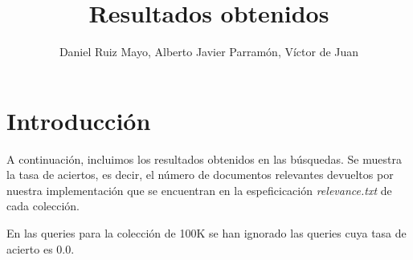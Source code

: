 \documentclass[palatino]{apuntes}
\title{Resultados obtenidos}
\author{Daniel Ruiz Mayo, Alberto Javier Parramón, Víctor de Juan}
\date{}
\begin{document}
\pagestyle{plain}
\maketitle
\section{Introducción}
A continuación, incluimos los resultados obtenidos en las búsquedas. Se muestra la tasa de aciertos, es decir, el número de documentos relevantes devueltos por nuestra implementación que se encuentran en la espeficicación \textit{relevance.txt} de cada colección.

En las queries para la colección de 100K se han ignorado las queries cuya tasa de acierto es 0.0.




\appendix
\end{document}

